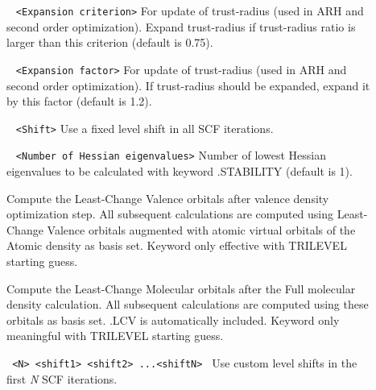 \begin{description}
\item[] \verb| | \newline
\verb|<Expansion criterion>|\newline 
For update of trust-radius (used in ARH and second order optimization). Expand trust-radius
if trust-radius ratio is larger than this criterion (default is 0.75).
\item[] \verb| | \newline
\verb|<Expansion factor>|\newline 
For update of trust-radius (used in ARH and second order optimization). If trust-radius
should be expanded,
expand it by this factor (default is 1.2).
\item[] \verb| | \newline
\verb|<Shift>|\newline 
Use a fixed level shift in all SCF iterations.
\item[] \verb| | \newline
\verb|<Number of Hessian eigenvalues>|\newline
Number of lowest Hessian eigenvalues to be calculated with keyword .STABILITY 
(default is 1). 
\item[] Compute the Least-Change Valence orbitals after valence density optimization step.
All subsequent calculations are computed using Least-Change Valence orbitals augmented with atomic virtual orbitals of the Atomic density as basis set.
Keyword only effective with TRILEVEL starting guess.
\item[]  Compute the Least-Change Molecular orbitals after the Full molecular density calculation.  All subsequent calculations are computed using these orbitals as basis set. .LCV is automatically included. Keyword only meaningful with TRILEVEL starting guess.
\item[] \verb| | \newline
\verb|<N> <shift1> <shift2> ...<shiftN> |\newline 
Use custom level shifts in the first {\it N} SCF iterations.


\end{description}
